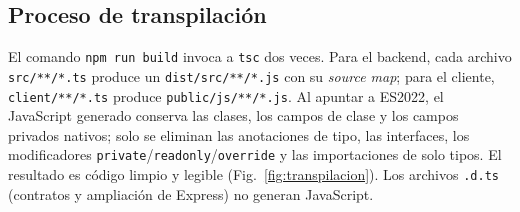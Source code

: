 \documentclass[conference,a4paper]{IEEEtran}
\begin{document}
\subsection{Proceso de transpilación}
El comando \texttt{npm run build} invoca a \texttt{tsc} dos veces. Para el backend, cada archivo \texttt{src/**/*.ts} produce un \texttt{dist/src/**/*.js} con su \emph{source map}; para el cliente, \texttt{client/**/*.ts} produce \texttt{public/js/**/*.js}. Al apuntar a ES2022, el JavaScript generado conserva las clases, los campos de clase y los campos privados nativos; solo se eliminan las anotaciones de tipo, las interfaces, los modificadores \texttt{private}/\texttt{readonly}/\texttt{override} y las importaciones de solo tipos. El resultado es código limpio y legible (Fig.~\ref{fig:transpilacion}). Los archivos \texttt{.d.ts} (contratos y ampliación de Express) no generan JavaScript.
\end{document}
